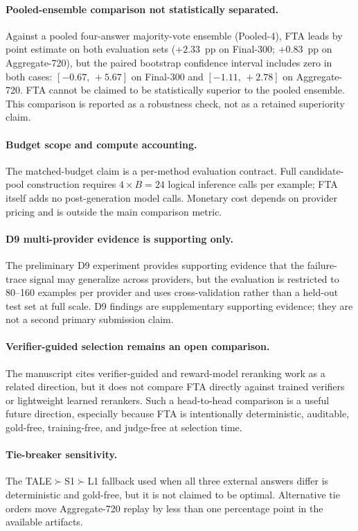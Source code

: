 \paragraph{Pooled-ensemble comparison not statistically separated.}
Against a pooled four-answer majority-vote ensemble (Pooled-4), FTA leads by
point estimate on both evaluation sets ($+2.33$~pp on Final-300;
$+0.83$~pp on Aggregate-720), but the paired bootstrap confidence interval
includes zero in both cases: $[-0.67,\,+5.67]$ on Final-300 and
$[-1.11,\,+2.78]$ on Aggregate-720.
FTA cannot be claimed to be statistically superior to the pooled ensemble.
This comparison is reported as a robustness check, not as a retained
superiority claim.

\paragraph{Budget scope and compute accounting.}
The matched-budget claim is a per-method evaluation contract.
Full candidate-pool construction requires $4 \times B = 24$ logical inference
calls per example; FTA itself adds no post-generation model calls.
Monetary cost depends on provider pricing and is outside the main comparison
metric.

\paragraph{D9 multi-provider evidence is supporting only.}
The preliminary D9 experiment provides supporting evidence that the
failure-trace signal may generalize across providers, but the evaluation is
restricted to 80--160 examples per provider and uses cross-validation rather
than a held-out test set at full scale.
D9 findings are supplementary supporting evidence; they are not a second primary
submission claim.

\paragraph{Verifier-guided selection remains an open comparison.}
The manuscript cites verifier-guided and reward-model reranking work as a
related direction, but it does not compare FTA directly against trained
verifiers or lightweight learned rerankers. Such a head-to-head comparison is a
useful future direction, especially because FTA is intentionally deterministic,
auditable, gold-free, training-free, and judge-free at selection time.

\paragraph{Tie-breaker sensitivity.}
The TALE$\succ$S1$\succ$L1 fallback used when all three external answers
differ is deterministic and gold-free, but it is not claimed to be optimal.
Alternative tie orders move Aggregate-720 replay by less than one percentage
point in the available artifacts.

